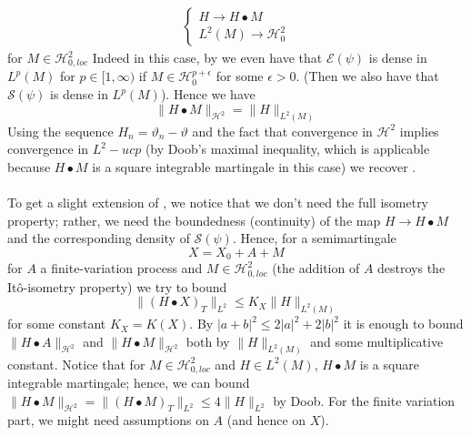 \documentclass[11pt]{report}
\theoremstyle{plain} %
\theoremstyle{definition} %
\theoremstyle{remark} %
\begin{document}
\begin{align}
    \begin{cases}
        H\to H\bullet M\\
        L^2(M)\to\mathcal{H}^2_0
    \end{cases}
\end{align}
for \(M\in\mathcal{H}^2_{0,loc}\)
Indeed in this case, by \parencite[Thm~5.32]{Arandjelovic2025} we even have that \(\mathcal{E}(\psi)\) is dense in \(L^p(M)\) for \(p\in[1,\infty)\) if \(M\in\mathcal{H}_0^{p+\epsilon}\) for some \(\epsilon>0\). (Then we also have that \(\mathcal{S}(\psi)\) is dense in \(L^p(M)\)). Hence we have 
\begin{equation}
    \lVert H\bullet M\rVert_{\mathcal{H}^2}=\lVert H\rVert_{L^2(M)}
\end{equation}
Using the sequence \(H_n=\vartheta_n-\vartheta\) and the fact that convergence in \(\mathcal{H}^2\) implies convergence in \(L^2-ucp\) (by Doob's maximal inequality, which is applicable because \(H\bullet M\) is a square integrable martingale in this case) we recover \parencite[Thm~5.35]{Arandjelovic2025}.
\\\\
To get a slight extension of \parencite[Thm~5.35]{Arandjelovic2025}, we notice that we don't need the full isometry property; rather, we need the boundedness (continuity) of the map \(H\to H \bullet M\) and the corresponding density of \(\mathcal{S}(\psi)\). Hence, for a semimartingale 
\begin{equation}
    X = X_0 + A + M
\end{equation}
for \(A\) a finite-variation process and \(M\in\mathcal{H}^2_{0,loc}\) (the addition of \(A\) destroys the Itô-isometry property) we try to bound 
\begin{equation}
     \lVert \left(H\bullet X\right)_T\rVert_{L^2}\leq K_X\lVert H\rVert_{L^2(M)}
\end{equation}
for some constant \(K_X = K(X)\). By \(|a+b|^2\leq 2|a|^2+2|b|^2\) it is enough to bound \(\lVert H\bullet A\rVert_{\mathcal{H}^2}\) and \(\lVert H\bullet M\rVert_{\mathcal{H}^2}\) both by \(\lVert H\rVert_{L^2(M)}\) and some multiplicative constant. Notice that for \(M\in\mathcal{H}^2_{0,loc}\) and \( H \in L^2(M)\), \(H\bullet M\) is a square integrable martingale; hence, we can bound \(\lVert H\bullet M\rVert_{\mathcal{H}^2}=\lVert (H\bullet M)_T\rVert_{L^2}\leq 4\lVert H\rVert_{L^2}\) by Doob. For the finite variation part, we might need assumptions on \(A\) (and hence on \(X\)).
\\
\end{document}

